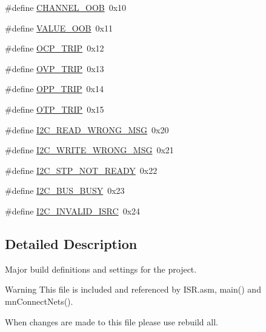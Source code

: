 {\bf }\par
\begin{DoxyCompactItemize}
\item 
\#define \hyperlink{a00043_a5f4c019658ca5a8eff4bfc3d96d489a0}{C\-H\-A\-N\-N\-E\-L\-\_\-\-O\-O\-B}~0x10
\item 
\#define \hyperlink{a00043_a055087c0064c322a05e443b47479bfe1}{V\-A\-L\-U\-E\-\_\-\-O\-O\-B}~0x11
\item 
\#define \hyperlink{a00043_a42d97deed6614a0b5b0aee655055b43a}{O\-C\-P\-\_\-\-T\-R\-I\-P}~0x12
\item 
\#define \hyperlink{a00043_ac330c784fd08c389f8649ac8e34d29e8}{O\-V\-P\-\_\-\-T\-R\-I\-P}~0x13
\item 
\#define \hyperlink{a00043_a7037d8fd93cf1a2ae591b639614c0338}{O\-P\-P\-\_\-\-T\-R\-I\-P}~0x14
\item 
\#define \hyperlink{a00043_a5815c03ac63c324e326a148e247f24a1}{O\-T\-P\-\_\-\-T\-R\-I\-P}~0x15
\item 
\#define \hyperlink{a00043_aec1cab1af7dceb601fa90842135a4f65}{I2\-C\-\_\-\-R\-E\-A\-D\-\_\-\-W\-R\-O\-N\-G\-\_\-\-M\-S\-G}~0x20
\item 
\#define \hyperlink{a00043_ac6997f1781d1d9047bd556dd5152795b}{I2\-C\-\_\-\-W\-R\-I\-T\-E\-\_\-\-W\-R\-O\-N\-G\-\_\-\-M\-S\-G}~0x21
\item 
\#define \hyperlink{a00043_af623f6210c2ce545f939ec061fc533b0}{I2\-C\-\_\-\-S\-T\-P\-\_\-\-N\-O\-T\-\_\-\-R\-E\-A\-D\-Y}~0x22
\item 
\#define \hyperlink{a00043_ad3082827214b064d5b8289acaeb9ad20}{I2\-C\-\_\-\-B\-U\-S\-\_\-\-B\-U\-S\-Y}~0x23
\item 
\#define \hyperlink{a00043_a8e605ae1b9fc359d203b90cb9f8a090e}{I2\-C\-\_\-\-I\-N\-V\-A\-L\-I\-D\-\_\-\-I\-S\-R\-C}~0x24
\end{DoxyCompactItemize}



\subsection{Detailed Description}
Major build definitions and settings for the project. \begin{DoxyWarning}{Warning}
This file is included and referenced by I\-S\-R.\-asm, main() and mn\-Connect\-Nets().

When changes are made to this file please use rebuild all. 
\end{DoxyWarning}



